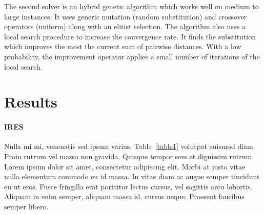 \documentclass[10pt,letterpaper]{article}
\begin{document}
\noindent The second solver is an hybrid genetic algorithm which works well on medium to large instances. It uses generic mutation (random substitution) and crossover operators (uniform) along with an elitist selection. The algorithm also uses a local search procedure to increase the convergence rate. It finds the substitution which improves the most the current sum of pairwise distances. With a low probability, the improvement operator applies a small number of iterations of the local search.



\newpage





\newpage
\section*{Results}




\paragraph{IRES}


Nulla mi mi, venenatis sed ipsum varius, Table~\ref{table1} volutpat euismod diam. Proin rutrum vel massa non gravida. Quisque tempor sem et dignissim rutrum. Lorem ipsum dolor sit amet, consectetur adipiscing elit. Morbi at justo vitae nulla elementum commodo eu id massa. In vitae diam ac augue semper tincidunt eu ut eros. Fusce fringilla erat porttitor lectus cursus, vel sagittis arcu lobortis. Aliquam in enim semper, aliquam massa id, cursus neque. Praesent faucibus semper libero.
\end{document}
